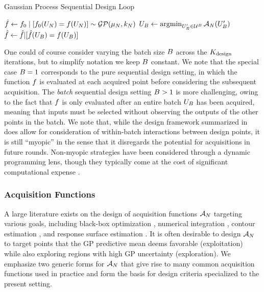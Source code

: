 \documentclass[12pt]{article}
\begin{document}
\begin{algorithm}
    \caption{Gaussian Process Sequential Design Loop}
    \label{alg:seq_des_loop}
    \begin{algorithmic}[1] %
	\State $\hat{\func} \gets \funcPrior \given [\funcPrior(\designIn[\Ndesign]) = \func(\designIn[\Ndesign])] \sim \GP(\gpMean[\Ndesign], \gpKer[\Ndesign])$
         
        		\State $\designBatchIn \gets \argmin_{\designBatchIn^\prime \in \parSpace^{\Nbatch}} \acq[\Ndesign](\designBatchIn^\prime)$ 
		\State $\hat{f} \gets \hat{f} | [\hat{f}(\designBatchIn) = \func(\designBatchIn)]$
	\EndFor
	\EndFunction
    \end{algorithmic}
\end{algorithm}

One could of course consider 
varying the batch size $\Nbatch$ across the $\Nrounds$ iterations, but to simplify notation we keep $\Nbatch$ constant. We note that the 
special case $\Nbatch = 1$ corresponds to the pure sequential design setting, in which the function $\func$ is evaluated at each acquired 
point before considering the subsequent acquisition. The \textit{batch} sequential design setting $\Nbatch > 1$ is more challenging,  
owing to the fact that $\func$ is only evaluated after an entire batch $\designBatchIn$ has been acquired, meaning that inputs must 
be selected without observing the outputs of the other points in the batch. 
We note that, while the design framework summarized in  does allow for consideration 
of within-batch interactions between design points, 
it is still ``myopic'' in the sense that it disregards the potential for acquisitions in future rounds. 
Non-myopic strategies have been considered
through a dynamic programming lens, though they typically come at the cost of significant 
computational expense \citep{SURThesis, supermartingaleSUR}. 

\subsubsection{Acquisition Functions}
A large literature exists on the design of acquisition functions $\acq[\Ndesign]$ targeting various goals, including 
black-box optimization \citep{reviewBayesOpt, gramacy2020surrogates}, 
numerical integration \citep{BayesQuadrature, BayesQuadrature, BayesQuadRatios},
contour estimation \citep{contourEstimation, cole2021entropybased}, and response surface estimation 
\citep{gramacy2020surrogates, SanterCompExp, design_analysis_computer_experiments}.
It is often desirable to design $\acq[\Ndesign]$ to target points that the GP predictive mean deems favorable 
(exploitation) while also exploring regions with high GP uncertainty (exploration). We emphasize two 
generic forms for $\acq[\Ndesign]$ that give rise to many common acquisition functions used in practice
and form the basis for design criteria specialized to the present setting.
\end{document}
